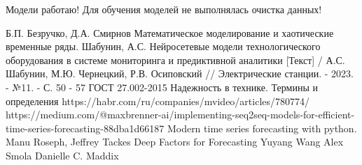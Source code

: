 \documentclass[12pt,a4paper]{article}
\begin{document}
Модели работаю! Для обучения моделей не выполнялась очистка данных!

\newpage
\begin{thebibliography}{}
	 Б.П. Безручко, Д.А. Смирнов Математическое моделирование и хаотические временные ряды.
	 Шабунин, А.С. Нейросетевые модели технологического оборудования в системе мониторинга и предиктивной аналитики [Текст] / А.С. Шабунин, М.Ю. Чернецкий, Р.В. Осиповский // Электрические станции. - 2023. - №11. - С. 50 - 57
	 ГОСТ 27.002-2015 Надежность в технике. Термины и определения
	 https://habr.com/ru/companies/mvideo/articles/780774/
	 https://medium.com/@maxbrenner-ai/implementing-seq2seq-models-for-efficient-time-series-forecasting-88dba1d66187
	 Modern time series forecasting with python. Manu Roseph, Jeffrey Tackes
	 Deep Factors for Forecasting Yuyang Wang Alex Smola Danielle C. Maddix 
\end{thebibliography}
\end{document}
